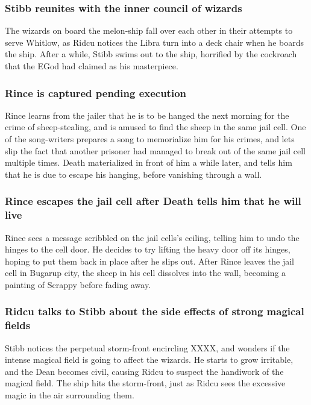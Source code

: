 \subsubsection{\Gls{Stibb} reunites with the inner council of wizards}
The wizards on board the melon-ship fall over each other in their attempts to serve \Gls{Whitlow},
as \Gls{Ridcu} notices the \Gls{Libra} turn into a deck chair when he boards the ship. After a
while, \Gls{Stibb} swims out to the ship, horrified by the cockroach that the \Gls{EGod} had
claimed as his masterpiece.

\subsubsection{\Gls{Rince} is captured pending execution}
\Gls{Rince} learns from the jailer that he is to be hanged the next morning for the crime of
sheep-stealing, and is amused to find the sheep in the same jail cell. One of the song-writers
prepares a song to memorialize him for his crimes, and lets slip the fact that another prisoner had
managed to break out of the same jail cell multiple times. \Gls{Death} materialized in front of
him a while later, and tells him that he is due to escape his hanging, before vanishing through a
wall.

\subsubsection{\Gls{Rince} escapes the jail cell after \Gls{Death} tells him that he will live}
\Gls{Rince} sees a message scribbled on the jail cells's ceiling, telling him to undo the hinges to
the cell door. He decides to try lifting the heavy door off its hinges, hoping to put them back in
place after he slips out. After \Gls{Rince} leaves the jail cell in Bugarup city, the sheep in his
cell dissolves into the wall, becoming a painting of \Gls{Scrappy} before fading away.

\subsubsection{\Gls{Ridcu} talks to \Gls{Stibb} about the side effects of strong magical fields}
\Gls{Stibb} notices the perpetual storm-front encircling XXXX, and wonders if the intense magical
field is going to affect the wizards. He starts to grow irritable, and the \Gls{Dean} becomes
civil, causing \Gls{Ridcu} to suspect the handiwork of the magical field. The ship hits the
storm-front, just as \Gls{Ridcu} sees the excessive magic in the air surrounding them.

